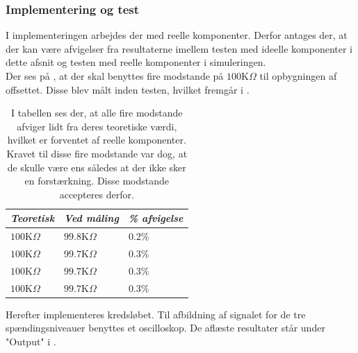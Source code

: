 \subsubsection{Implementering og test}
I implementeringen arbejdes der med reelle komponenter. Derfor antages der, at der kan være afvigelser fra resultaterne imellem testen med ideelle komponenter i dette afsnit og testen med reelle komponenter i simuleringen. \\
Der ses på , at der skal benyttes fire modstande på $100$K$\Omega$ til opbygningen af offsettet. Disse blev målt inden testen, hvilket fremgår i .
\begin{table}[H]
	\centering
	\begin{tabular}{|l|l|l|}
		\hline
		\textit{Teoretisk} & \textit{Ved måling} & \textit{\% afvigelse} \\ \hline
		$100$K$\Omega$       & $99.8$K$\Omega$       & $0.2$\%               \\ \hline
		$100$K$\Omega$       & $99.7$K$\Omega$       & $0.3$\%               \\ \hline
		$100$K$\Omega$       & $99.7$K$\Omega$       & $0.3$\%               \\ \hline
		$100$K$\Omega$       & $99.7$K$\Omega$       & $0.3$\%               \\ \hline
	\end{tabular}
	\caption{I tabellen ses der, at alle fire modstande afviger lidt fra deres teoretiske værdi, hvilket er forventet af reelle komponenter. Kravet til disse fire modstande var dog, at de skulle være ens således at der ikke sker en forstærkning. Disse modstande accepteres derfor.}
	\label{Tab:modstand_offset}
\end{table}
\noindent Herefter implementeres kredsløbet. Til afbildning af signalet for de tre spændingsniveauer benyttes et oscilloskop. De aflæste resultater står under "Output" i .
